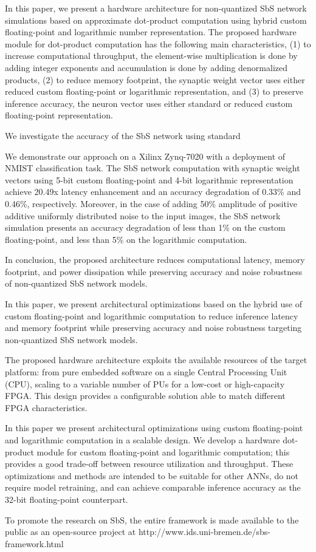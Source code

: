 In this paper, we present a hardware architecture for non-quantized SbS network simulations based on approximate dot-product computation using hybrid custom floating-point and logarithmic number representation. The proposed hardware module for dot-product computation has the following main characteristics, (1) to increase computational throughput, the element-wise multiplication is done by adding integer exponents and accumulation is done by adding denormalized products, (2) to reduce memory footprint, the synaptic weight vector uses either reduced custom floating-point or logarithmic representation, and (3) to preserve inference accuracy, the neuron vector uses either standard or reduced custom floating-point representation.

We investigate the accuracy of the SbS network using standard 

We demonstrate our approach on a Xilinx Zynq-7020 with a deployment of NMIST classification task. The SbS network computation with synaptic weight vectors using 5-bit custom floating-point and 4-bit logarithmic representation achieve 20.49x latency enhancement and an accuracy degradation of 0.33\% and 0.46\%, respectively. Moreover, in the case of adding 50\% amplitude of positive additive uniformly distributed noise to the input images, the SbS network simulation presents an accuracy degradation of less than 1\% on the custom floating-point, and less than 5\% on the logarithmic computation.

In conclusion, the proposed architecture reduces computational latency, memory footprint, and power dissipation while preserving accuracy and noise robustness of non-quantized SbS network models.

In this paper, we present architectural optimizations based on the hybrid use of custom floating-point and logarithmic computation to reduce inference latency and memory footprint while preserving accuracy and noise robustness targeting non-quantized SbS network models.

The proposed hardware architecture exploits the available resources of the target platform: from pure embedded software on a single Central Processing Unit (CPU), scaling to a variable number of PUs for a low-cost or high-capacity FPGA. This design provides a configurable solution able to match different FPGA characteristics.

In this paper we present architectural optimizations using custom floating-point and logarithmic computation in a scalable design. We develop a hardware dot-product module for custom floating-point and logarithmic computation; this provides a good trade-off between resource utilization and throughput. These optimizations and methods are intended to be suitable for other ANNs, do not require model retraining, and can achieve comparable inference accuracy as the 32-bit floating-point counterpart.


To promote the research on SbS, the entire framework is made available to the public as an open-source project at http://www.ids.uni-bremen.de/sbs-framework.html

